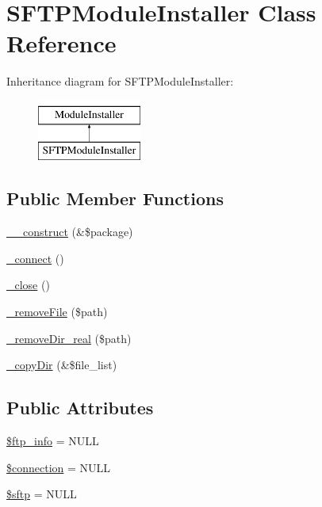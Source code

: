 \hypertarget{classSFTPModuleInstaller}{\section{S\-F\-T\-P\-Module\-Installer Class Reference}
\label{classSFTPModuleInstaller}
}
Inheritance diagram for S\-F\-T\-P\-Module\-Installer\-:\begin{figure}[H]
\begin{center}
\leavevmode
\includegraphics[height=2.000000cm]{classSFTPModuleInstaller}
\end{center}
\end{figure}
\subsection*{Public Member Functions}
\begin{DoxyCompactItemize}
\item 
\hyperlink{classSFTPModuleInstaller_ae9955bf0e13a1f7bd2ea64244ae06b46}{\-\_\-\-\_\-construct} (\&\$package)
\item 
\hyperlink{classSFTPModuleInstaller_a50b67d17519fb8e86aa5c44031daa63f}{\-\_\-connect} ()
\item 
\hyperlink{classSFTPModuleInstaller_a6f2c54d7303968d97d1026a00ba0961a}{\-\_\-close} ()
\item 
\hyperlink{classSFTPModuleInstaller_abd1dd628941e99ee3ab526cf19cc7d54}{\-\_\-remove\-File} (\$path)
\item 
\hyperlink{classSFTPModuleInstaller_a2acd47768689f3b71562bfc5f53ea888}{\-\_\-remove\-Dir\-\_\-real} (\$path)
\item 
\hyperlink{classSFTPModuleInstaller_a57832797085ca931efd64c1080186e49}{\-\_\-copy\-Dir} (\&\$file\-\_\-list)
\end{DoxyCompactItemize}
\subsection*{Public Attributes}
\begin{DoxyCompactItemize}
\item 
\hyperlink{classSFTPModuleInstaller_a9c6b08191ecc35a10ed025b02d337b41}{\$ftp\-\_\-info} = N\-U\-L\-L
\item 
\hyperlink{classSFTPModuleInstaller_a469153f66f7c46047f51a6e99cd560ba}{\$connection} = N\-U\-L\-L
\item 
\hyperlink{classSFTPModuleInstaller_aafcf5a295a98403473988943b073838c}{\$sftp} = N\-U\-L\-L
\end{DoxyCompactItemize}


